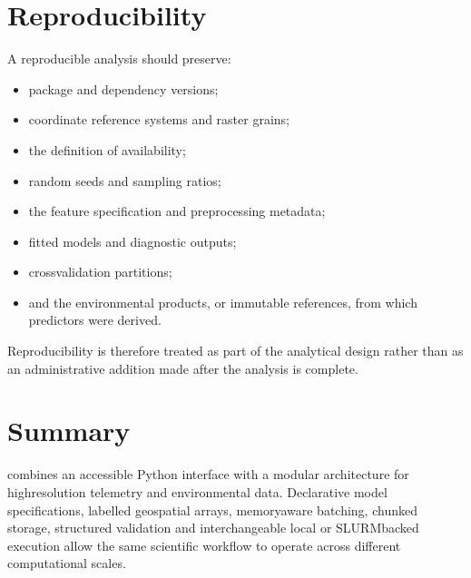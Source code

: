\documentclass[letterpaper,10pt,english]{sphinxmanual}
\begin{document}
\section{Reproducibility}
\label{\detokenize{implementation:reproducibility}}
\sphinxAtStartPar
A reproducible  analysis should preserve:
\begin{itemize}
\item {} 
\sphinxAtStartPar
package and dependency versions;

\item {} 
\sphinxAtStartPar
coordinate reference systems and raster grains;

\item {} 
\sphinxAtStartPar
the definition of availability;

\item {} 
\sphinxAtStartPar
random seeds and sampling ratios;

\item {} 
\sphinxAtStartPar
the feature specification and preprocessing metadata;

\item {} 
\sphinxAtStartPar
fitted models and diagnostic outputs;

\item {} 
\sphinxAtStartPar
cross\sphinxhyphen{}validation partitions;

\item {} 
\sphinxAtStartPar
and the environmental products, or immutable references, from which predictors were derived.

\end{itemize}

\sphinxAtStartPar
Reproducibility is therefore treated as part of the analytical design rather than as an administrative addition made after the analysis is complete.


\section{Summary}
\label{\detokenize{implementation:summary}}
\sphinxAtStartPar
{} combines an accessible Python interface with a modular architecture for high\sphinxhyphen{}resolution telemetry and environmental data. Declarative model specifications, labelled geospatial arrays, memory\sphinxhyphen{}aware batching, chunked storage, structured validation and interchangeable local or SLURM\sphinxhyphen{}backed execution allow the same scientific workflow to operate across different computational scales.
\end{document}

